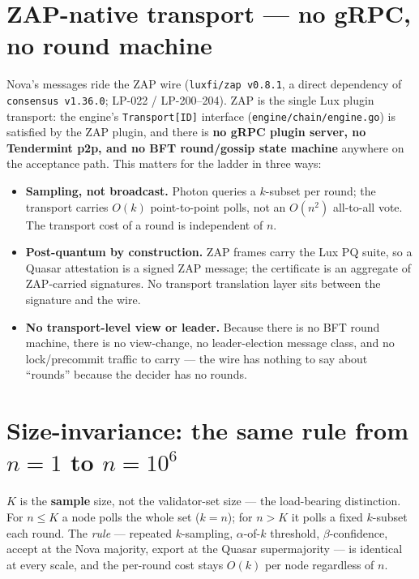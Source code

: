 \documentclass[11pt,a4paper]{article}
\begin{document}
\section{ZAP-native transport --- no gRPC, no round machine}
\label{sec:zap}

Nova's messages ride the ZAP wire (\texttt{luxfi/zap v0.8.1}, a direct dependency of
\texttt{consensus v1.36.0}; LP-022 / LP-200--204). ZAP is the single Lux plugin transport:
the engine's \texttt{Transport[ID]} interface (\texttt{engine/chain/engine.go}) is satisfied
by the ZAP plugin, and there is \textbf{no gRPC plugin server, no Tendermint p2p, and no
BFT round/gossip state machine} anywhere on the acceptance path. This matters for the ladder
in three ways:

\begin{itemize}[leftmargin=1.4em]
\item \textbf{Sampling, not broadcast.} Photon queries a \(k\)-subset per round; the transport
carries \(O(k)\) point-to-point polls, not an \(O(n^2)\) all-to-all vote. The transport cost
of a round is independent of \(n\).
\item \textbf{Post-quantum by construction.} ZAP frames carry the Lux PQ suite, so a Quasar
attestation is a signed ZAP message; the certificate is an aggregate of ZAP-carried
signatures. No transport translation layer sits between the signature and the wire.
\item \textbf{No transport-level view or leader.} Because there is no BFT round machine, there
is no view-change, no leader-election message class, and no lock/precommit traffic to carry ---
the wire has nothing to say about ``rounds'' because the decider has no rounds.
\end{itemize}

\section{Size-invariance: the same rule from \(n=1\) to \(n=10^6\)}
\label{sec:scale}

\(K\) is the \textbf{sample} size, not the validator-set size --- the load-bearing
distinction. For \(n\le K\) a node polls the whole set (\(k=n\)); for \(n>K\) it polls a fixed
\(k\)-subset each round. The \emph{rule} --- repeated \(k\)-sampling, \(\alpha\)-of-\(k\)
threshold, \(\beta\)-confidence, accept at the Nova majority, export at the Quasar
supermajority --- is identical at every scale, and the per-round cost stays \(O(k)\) per node
regardless of \(n\).
\end{document}
